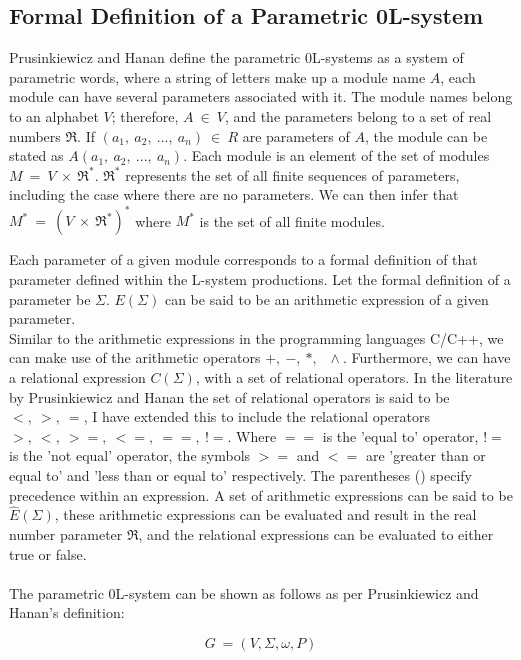 \subsection{Formal Definition of a Parametric 0L-system} \label{definition of a parametric 0L-system section}

Prusinkiewicz and Hanan define the parametric 0L-systems as a system of parametric words, where a string of letters make up a module name $A$, each module can have several parameters associated with it. The module names belong to an alphabet $V$; therefore, $A~ \in~ V$, and the parameters belong to a set of real numbers $\Re$. If $(a_1,~ a_2,~ ...,~ a_n)~ \in~ R$ are parameters of $A$, the module can be stated as $A(a_1,~ a_2,~ ...,~ a_n)$. Each module is an element of the set of modules $M~ =~ V~ \times~ \Re^*$. $\Re^*$ represents the set of all finite sequences of parameters, including the case where there are no parameters. We can then infer that $M^*~ =~ (V~ \times~ \Re^*)^*$ where $M^*$ is the set of all finite modules. 

Each parameter of a given module corresponds to a formal definition of that parameter defined within the L-system productions. Let the formal definition of a parameter be $\Sigma$. $ E(\Sigma) $ can be said to be an arithmetic expression of a given parameter.\\ Similar to the arithmetic expressions in the programming languages C/C++, we can make use of the arithmetic operators $ +,~ -,~ *,~ \,~ \wedge{}$. Furthermore, we can have a relational expression $C(\Sigma)$, with a set of relational operators. In the literature by Prusinkiewicz and Hanan the set of relational operators is said to be $<,~ >,~ =$, I have extended this to include the relational operators $>,~ <,~ >=,~ <=,~ ==,~ !=$. Where $==$ is the 'equal to' operator, $!=$ is the 'not equal' operator, the symbols $>=$ and $<=$ are 'greater than or equal to' and 'less than or equal to' respectively. The parentheses () specify precedence within an expression. A set of arithmetic expressions can be said to be $\hat{E} (\Sigma)$,  these arithmetic expressions can be evaluated and result in the real number parameter $\Re $, and the relational expressions can be evaluated to either true or false. \\
\\
The parametric 0L-system can be shown as follows as per Prusinkiewicz and Hanan's definition:

\begin{equation}
G~ = (V, \Sigma, \omega, P)
\end{equation}
\vspace{5mm}

